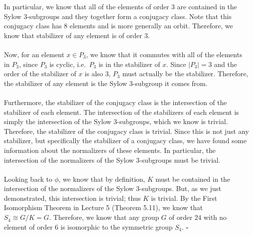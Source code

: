 \documentclass[letterpaper]{article}
\newcommand*{\QED}{\hfill\ensuremath{\square}}%
\begin{document}
In particular, we know that all of the elements of order $ 3 $ are contained in the Sylow $ 3 $-subgroups and they together form a conjugacy class.
Note that this conjugacy class has $ 8 $ elements and is more generally an orbit.
Therefore, we know that stabilizer of any element is of order $ 3 $.
\\ \\
Now, for an element $ x \in P_3 $, we know that it commutes with all of the elements in $ P_3 $, since $ P_3 $ is cyclic, i.e.\ $ P_3 $ is in the stabilizer of $ x $.
Since $ |P_3| = 3 $ and the order of the stabilizer of $ x $ is also $ 3 $, $ P_3 $ must actually be the stabilizer.
Therefore, the stabilizer of any element is the Sylow $ 3 $-subgroup it comes from.
\\ \\
Furthermore, the stabilizer of the conjugacy class is the intersection of the stabilizer of each element.
The intersection of the stabilizers of each element is simply the intersection of the Sylow $ 3 $-subgroups, which we know is trivial.
Therefore, the stabilizer of the conjugacy class is trivial.
Since this is not just any stabilizer, but specifically the stabilizer of a conjugacy class, we have found some information about the normalizers of these elements.
In particular, the intersection of the normalizers of the Sylow $ 3 $-subgroups must be trivial.
\\ \\
Looking back to $ \phi $, we know that by definition, $ K $ must be contained in the intersection of the normalizers of the Sylow $ 3 $-subgroups.
But, as we just demonstrated, this intersection is trivial; thus $ K $ is trivial.
By the First Isomorphism Theorem in Lecture 5 (Theorem 5.11), we know that $ S_4 \cong G / K = G $.
Therefore, we know that any group $ G $ of order $ 24 $ with no element of order $ 6 $ is isomorphic to the symmetric group $ S_4 $.
\QED{}

\section{}
\label{sec:Question2}
\end{document}

